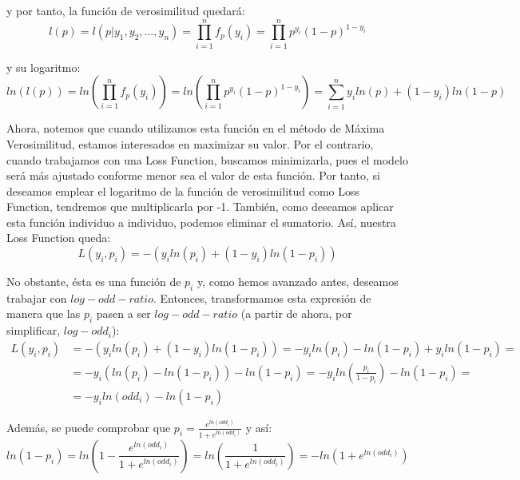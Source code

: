 \documentclass[12pt,twoside]{article}
\begin{document}
\noindent
y por tanto, la función de verosimilitud quedará:
\begin{equation*}
l(p) = l(p|y_1, y_2, \dots, y_n) = \prod_{i=1}^n f_p(y_i) = \prod_{i=1}^n p^{y_i}(1-p)^{1-y_i}
\end{equation*}

\noindent
y su logaritmo:
\begin{equation*}
ln(l(p)) = ln \left( \prod_{i=1}^n f_p(y_i) \right) = ln \left( \prod_{i=1}^n p^{y_i}(1-p)^{1-y_i} \right) = \sum_{i=1}^n y_i ln(p) + (1-y_i)ln(1-p)
\end{equation*}

Ahora, notemos que cuando utilizamos esta función en el método de Máxima Verosimilitud, estamos interesados en maximizar su valor. Por el contrario, cuando trabajamos con una Loss Function, buscamos minimizarla, pues el modelo será más ajustado conforme menor sea el valor de esta función. Por tanto, si deseamos emplear el logaritmo de la función de verosimilitud como Loss Function, tendremos que multiplicarla por -1. También, como deseamos aplicar esta función individuo a individuo, podemos eliminar el sumatorio. Así, nuestra Loss Function queda:
\begin{equation*}
L(y_i, p_i) = -( y_i ln(p_i) + (1-y_i)ln(1-p_i))
\end{equation*}

No obstante, ésta es una función de $p_i$ y, como hemos avanzado antes, deseamos trabajar con $log-odd-ratio$. Entonces, transformamos esta expresión de manera que las $p_i$ pasen a ser $log-odd-ratio$ (a partir de ahora, por simplificar, $log-odd_i$):
\begin{equation*}
\begin{split}
L(y_i, p_i) &= -(y_i ln(p_i) + (1-y_i)ln(1-p_i)) = -y_i ln(p_i) - ln(1-p_i) + y_i ln(1-p_i) = \\
& = -y_i(ln(p_i) - ln(1-p_i)) - ln(1-p_i) = -y_i ln \left( \frac{p_i}{1-p_i} \right) - ln(1-p_i) = \\
& = -y_i ln(odd_i) - ln(1-p_i)
\end{split}
\end{equation*}

Además, se puede comprobar que $p_i = \frac{e^{ln(odd_i)}}{1 + e^{ln(odd_i)}}$ y así:
\begin{equation*}
ln(1-p_i) = ln \left( 1- \frac{e^{ln(odd_i)}}{1 + e^{ln(odd_i)}} \right) = ln \left( \frac{1}{1 + e^{ln(odd_i)}} \right) = - ln \left( 1 + e^{ln(odd_i)} \right)
\end{equation*}
\end{document}
